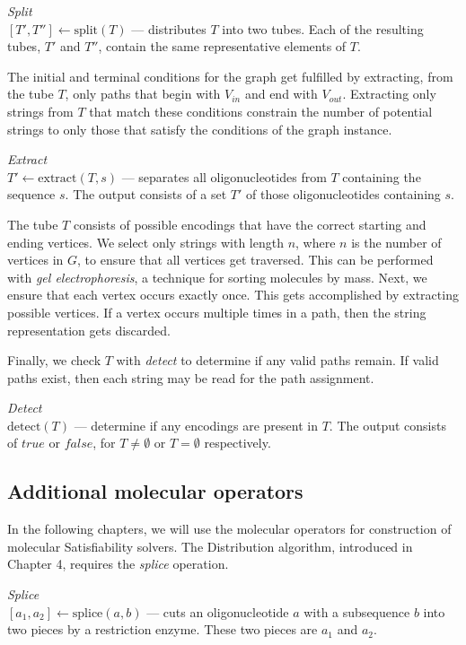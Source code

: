 \begin{definition}
\textit{Split}\\
$[T', T''] \leftarrow \text{split}( T)$ --- distributes $T$ into two tubes.  Each of the resulting tubes, $T'$ and $T''$,  contain the same representative elements of $T$.
\end{definition}

The initial and terminal conditions for the graph get fulfilled by extracting, from the tube $T$, only paths that begin with $V_{in}$ and end with $V_{out}$.  Extracting only strings from $T$ that match these conditions constrain the number of potential strings to only those that satisfy the conditions of the graph instance.

\begin{definition}
\textit{Extract}\\
$ T' \leftarrow \text{extract}( T, s)$ --- separates all oligonucleotides from $T$ containing the sequence $s$.  The output consists of a set $T'$ of those oligonucleotides containing $s$.
\end{definition}

The tube $T$ consists of possible encodings that have the correct starting and ending vertices. We select only strings with length $n$, where $n$ is the number of vertices in $G$, to ensure that all vertices get traversed.  This can be performed with \textit{gel electrophoresis}, a technique for sorting molecules by mass.
Next, we ensure that each vertex occurs exactly once.  This gets accomplished by extracting possible vertices.  If a vertex occurs multiple times in a path, then the string representation gets discarded.

Finally, we check $T$ with \textit{detect} to determine if any valid paths remain.  If valid paths exist, then each string may be read for the path assignment.

\begin{definition}
\textit{Detect}\\
$ \text{detect}( T)$ --- determine if any encodings are present in $T$.  The output consists of $true$ or $false$, for $T \neq \emptyset$ or $T = \emptyset$ respectively.
\end{definition}

\subsection{Additional molecular operators}

In the following chapters, we will use the molecular operators for construction of molecular {\sc Satisfiability} solvers.  The Distribution algorithm, introduced in Chapter 4, requires the \textit{splice} operation.
\begin{definition}
\textit{Splice}\\
$[a_1, a_2] \leftarrow \text{splice}(a, b)$ --- cuts an oligonucleotide $a$ with a subsequence $b$ into two pieces by a restriction enzyme.  These two pieces are $a_1$ and $a_2$.
\end{definition}

